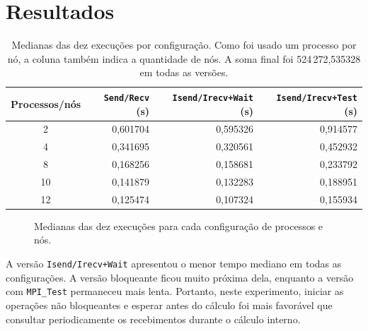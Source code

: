 \documentclass[11pt,letterpaper]{article}
\begin{document}
\section{Resultados}
\begin{table}[H]
\centering
\begin{tabular}{crrr}
\toprule
Processos/nós & \texttt{Send/Recv} (s) & \texttt{Isend/Irecv+Wait} (s) & \texttt{Isend/Irecv+Test} (s) \\
\midrule
2 & 0,601704 & 0,595326 & 0,914577 \\
4 & 0,341695 & 0,320561 & 0,452932 \\
8 & 0,168256 & 0,158681 & 0,233792 \\
10 & 0,141879 & 0,132283 & 0,188951 \\
12 & 0,125474 & 0,107324 & 0,155934 \\
\bottomrule
\end{tabular}
\caption{Medianas das dez execuções por configuração. Como foi usado um processo por nó, a coluna também indica a quantidade de nós. A soma final foi 524\,272,535328 em todas as versões.}
\label{tab:tempos}
\end{table}

\begin{figure}[H]
\centering
{}
\caption{Medianas das dez execuções para cada configuração de processos e nós.}
\label{fig:medianas}
\end{figure}

A versão \texttt{Isend/Irecv+Wait} apresentou o menor tempo mediano em todas as configurações. A versão bloqueante ficou muito próxima dela, enquanto a versão com \texttt{MPI\_Test} permaneceu mais lenta. Portanto, neste experimento, iniciar as operações não bloqueantes e esperar antes do cálculo foi mais favorável que consultar periodicamente os recebimentos durante o cálculo interno.
\end{document}
